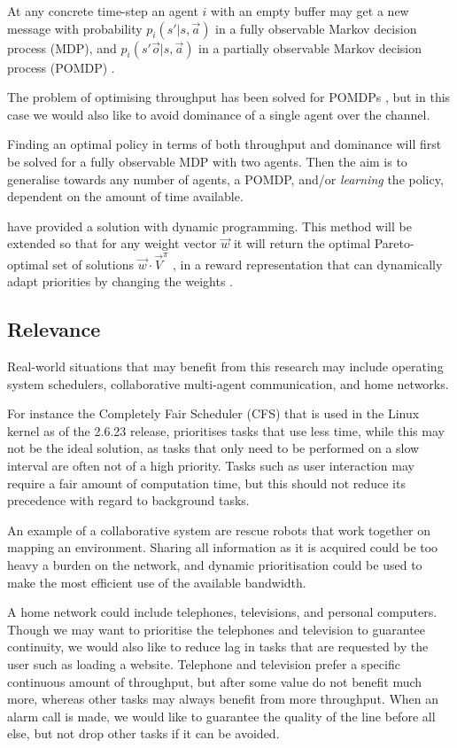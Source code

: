 \documentclass{article}
\begin{document}
\begin{multicols}{2}
	At any concrete time-step an agent $i$ with an empty buffer may get a new
	message with probability $p_i(s' |s, \vec{a})$ in a fully observable Markov
	decision process (MDP), and $p_i(s' \vec{o}|s, \vec{a})$ in a partially
	observable Markov decision process (POMDP) \citep{hansen2004dynamic}.

	The problem of optimising throughput has been solved for POMDPs
	\citep{ooi1996decentralized, hansen2004dynamic}, but in this case we would
	also like to avoid dominance of a single agent over the channel.

	Finding an optimal policy in terms of both throughput and dominance will
	first be solved for a fully observable MDP with two agents. Then the aim is
	to generalise towards any number of agents, a POMDP, and/or \emph{learning}
	the policy, dependent on the amount of time available.

	\citet{hansen2004dynamic} have provided a solution with dynamic programming.
	This method will be extended so that for any weight vector $\vec{w}$ it will
	return the optimal Pareto-optimal set of solutions $\vec{w} \cdot
	\vec{V}^\pi$ \citep{vamplew2011empirical}, in a reward representation that
	can dynamically adapt priorities by changing the weights
	\citep{barrett2008learning,natarajan2005dynamic}.

	\subsection{Relevance}
	\label{sub:relevance}
	Real-world situations that may benefit from this research may include
	operating system schedulers, collaborative multi-agent communication, and
	home networks.

	For instance the Completely Fair Scheduler (CFS) that is used in the Linux
	kernel as of the 2.6.23 release, prioritises tasks that use less time, while
	this may not be the ideal solution, as tasks that only need to be performed
	on a slow interval are often not of a high priority. Tasks such as user
	interaction may require a fair amount of computation time, but this should
	not reduce its precedence with regard to background tasks.

	An example of a collaborative system are rescue robots that work together on
	mapping an environment. Sharing all information as it is acquired could be
	too heavy a burden on the network, and dynamic prioritisation could be used
	to make the most efficient use of the available bandwidth.

	A home network could include telephones, televisions, and personal
	computers. Though we may want to prioritise the telephones and television to
	guarantee continuity, we would also like to reduce lag in tasks that are
	requested by the user such as loading a website. Telephone and television
	prefer a specific continuous amount of throughput, but after some value do
	not benefit much more, whereas other tasks may always benefit from more
	throughput. When an alarm call is made, we would like to guarantee the
	quality of the line before all else, but not drop other tasks if it can be
	avoided.


\end{multicols}
\end{document}
